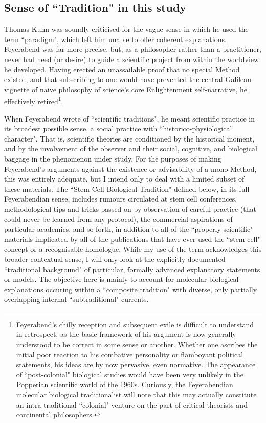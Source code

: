 \subsection{Sense of ``Tradition" in this study}

Thomas Kuhn was soundly criticised for the vague sense in which he used the term ``paradigm"\cite[p.206]{Schaffner1993}, which left him unable to offer coherent explanations. Feyerabend was far more precise, but, as a philosopher rather than a practitioner, never had need (or desire) to guide a scientific project from within the worldview he developed. Having erected an unassailable proof that no special Method existed, and that subscribing to one would have prevented the central Galilean vignette of naive philosophy of science's core Enlightenment self-narrative, he effectively retired\footnote{Feyerabend's chilly reception and subsequent exile is difficult to understand in retrospect, as the basic framework of his argument is now generally understood to be correct in some sense or another. Whether one ascribes the initial poor reaction to his combative personality or flamboyant political statements, his ideas are by now pervasive, even normative. The appearance of ``post-colonial" biological studies would have been very unlikely in the Popperian scientific world of the 1960s. Curiously, the Feyerabendian molecular biological traditionalist will note that this may actually constitute an intra-traditional ``colonial" venture on the part of critical theorists and continental philosophers.}.

When Feyerabend wrote of ``scientific traditions", he meant scientific practice in its broadest possible sense, a social practice with ``historico-physiological character". That is, scientific theories are conditioned by the historical moment, and by the involvement of the observer and their social, cognitive, and biological baggage in the phenomenon under study. For the purposes of making Feyerabend's arguments against the existence or advisability of a mono-Method, this was entirely adequate, but I intend only to deal with a limited subset of these materials. The ``Stem Cell Biological Tradition" defined below, in its full Feyerabendian sense, includes rumours circulated at stem cell conferences, methodological tips and tricks passed on by observation of careful practice (that could never be learned from any protocol), the commercial aspirations of particular academics, and so forth, in addition to all of the ``properly scientific" materials implicated by all of the publications that have ever used the ``stem cell" concept or a recognisable homologue. While my use of the term acknowledges this broader contextual sense, I will only look at the explicitly documented ``traditional background" of particular, formally advanced explanatory statements or models. The objective here is mainly to account for molecular biological explanations occuring within a ``composite tradition" with diverse, only partially overlapping internal ``subtraditional" currents.

